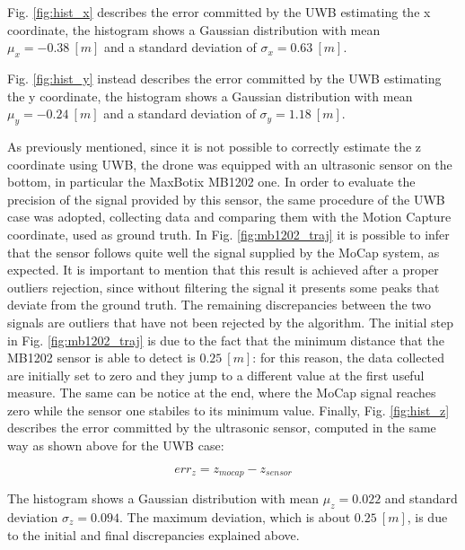 \documentclass[journal]{IEEEtran}
\begin{document}
Fig. \ref{fig:hist_x} describes the error committed by the UWB estimating the x coordinate, the histogram shows a Gaussian distribution with mean $\mu_x = -0.38 \ [m]$ and a standard deviation of $\sigma_x = 0.63 \ [m]$.

Fig. \ref{fig:hist_y} instead describes the error committed by the UWB estimating the y coordinate, the histogram shows a Gaussian distribution with mean $\mu_y = -0.24 \ [m]$ and a standard deviation of $\sigma_y = 1.18 \ [m]$.

As previously mentioned, since it is not possible to correctly estimate the z coordinate using UWB, the drone was equipped with an ultrasonic sensor on the bottom, in particular the MaxBotix MB1202 one. In order to evaluate the precision of the signal provided by this sensor, the same procedure of the UWB case was adopted, collecting data and comparing them with the Motion Capture coordinate, used as ground truth. In Fig. \ref{fig:mb1202_traj} it is possible to infer that the sensor follows quite well the signal supplied by the MoCap system, as expected. It is important to mention that this result is achieved after a proper outliers rejection, since without filtering the signal it presents some peaks that deviate from the ground truth. The remaining discrepancies between the two signals are outliers that have not been rejected by the algorithm. The initial step in Fig. \ref{fig:mb1202_traj} is due to the fact that the minimum distance that the MB1202 sensor is able to detect is $0.25 \ [m]$: for this reason, the data collected are initially set to zero and they jump to a different value at the first useful measure. The same can be notice at the end, where the MoCap signal reaches zero while the sensor one stabiles to its minimum value. Finally, Fig. \ref{fig:hist_z} describes the error committed by the ultrasonic sensor, computed in the same way as shown above for the UWB case: 

\begin{equation}
    err_z = z_{mocap} - z_{sensor}
\end{equation}

The histogram shows a Gaussian distribution with mean $\mu_z = 0.022$ and standard deviation $\sigma_z = 0.094$. The maximum deviation, which is about $0.25 \ [m]$, is due to the initial and final discrepancies explained above.
\end{document}
